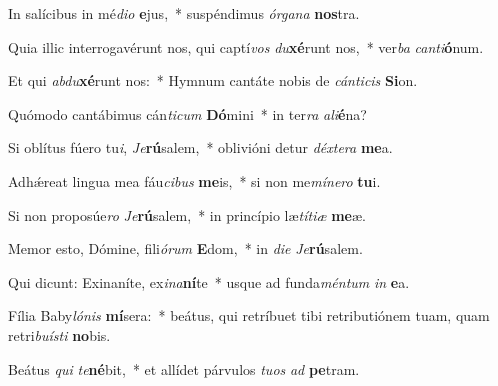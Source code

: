 \item In salícibus in mé\textit{di}\textit{o} \textbf{e}jus,~* suspéndimus \textit{ór}\textit{ga}\textit{na} \textbf{nos}tra.
\item Quia illic interrogavérunt nos, qui captí\textit{vos} \textit{du}\textbf{xé}runt nos,~* ver\textit{ba} \textit{can}\textit{ti}\textbf{ó}num.
\item Et qui \textit{ab}\textit{du}\textbf{xé}runt nos:~* Hymnum cantáte nobis de \textit{cán}\textit{ti}\textit{cis} \textbf{Si}on.
\item Quómodo cantábimus cán\textit{ti}\textit{cum} \textbf{Dó}mini~* in ter\textit{ra} \textit{a}\textit{li}\textbf{é}na?
\item Si oblítus fúero tu\textit{i}, \textit{Je}\textbf{rú}salem,~* oblivióni detur \textit{déx}\textit{te}\textit{ra} \textbf{me}a.
\item Adhǽreat lingua mea fáu\textit{ci}\textit{bus} \textbf{me}is,~* si non me\textit{mí}\textit{ne}\textit{ro} \textbf{tu}i.
\item Si non proposúe\textit{ro} \textit{Je}\textbf{rú}salem,~* in princípio læ\textit{tí}\textit{ti}\textit{æ} \textbf{me}æ.
\item Memor esto, Dómine, fili\textit{ó}\textit{rum} \textbf{E}dom,~* in \textit{di}\textit{e} \textit{Je}\textbf{rú}salem.
\item Qui dicunt: Exinaníte, ex\textit{i}\textit{na}\textbf{ní}te~* usque ad funda\textit{mén}\textit{tum} \textit{in} \textbf{e}a.
\item Fília Baby\textit{ló}\textit{nis} \textbf{mí}sera:~* beátus, qui retríbuet tibi retributiónem tuam, quam retri\textit{bu}\textit{ís}\textit{ti} \textbf{no}bis.
\item Beátus \textit{qui} \textit{te}\textbf{né}bit,~* et allídet párvulos \textit{tu}\textit{os} \textit{ad} \textbf{pe}tram.
